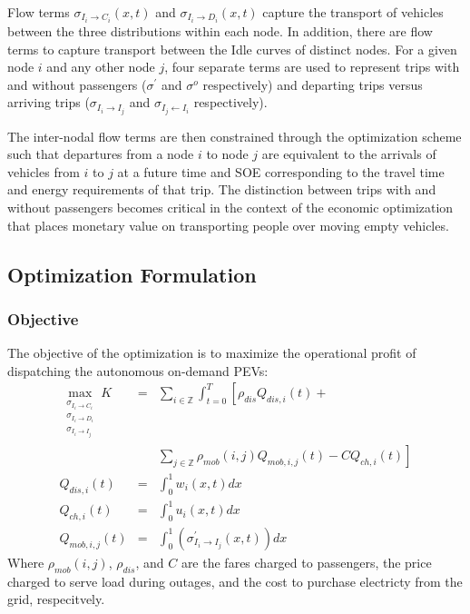 \documentclass[journal]{IEEEtran}
\begin{document}
Flow terms $\sigma_{I_i \rightarrow C_i}(x,t)$ and $\sigma_{I_i \rightarrow D_i}(x,t)$ capture the transport of vehicles between the three distributions within each node. In addition, there are flow terms to capture transport between the Idle curves of distinct nodes. For a given node $i$ and any other node $j$, four separate terms are used to represent trips with and without passengers ($\sigma^\prime$ and $\sigma^o$ respectively) and departing trips versus arriving trips ($\sigma_{I_i \rightarrow I_j}$ and $\sigma_{I_j \leftarrow I_i}$ respectively).

The inter-nodal flow terms are then constrained through the optimization scheme such that departures from a node $i$ to node $j$ are equivalent to the arrivals of vehicles from $i$ to $j$ at a future time and SOE corresponding to the travel time and energy requirements of that trip. The distinction between trips with and without passengers becomes critical in the context of the economic optimization that places monetary value on transporting people over moving empty vehicles.

\subsection{Optimization Formulation}

\subsubsection{Objective}
The objective of the optimization is to maximize the operational profit of dispatching the autonomous on-demand PEVs:
\begin{eqnarray*}
  \max_{\substack{\sigma_{I_i \rightarrow C_i} \\
    \sigma_{I_i \rightarrow D_i} \\ 
    \sigma_{I_i \rightarrow I_j}}}
    K &=& \sum_{i\in\mathbb{Z}} \int_{t=0}^{T} \left[ \rho_{dis} Q_{dis,i}(t) + \right. \\ 
      && \left. \sum_{j\in\mathbb{Z}}\rho_{mob}(i,j)Q_{mob,i,j}(t)  - CQ_{ch,i}(t) \right]\\
    Q_{dis,i}(t) & = & \int_{0}^{1} w_i(x,t) dx \\
    Q_{ch,i}(t) & = & \int_{0}^{1} u_i(x,t) dx \\
    Q_{mob,i,j}(t) & = & \int_{0}^{1}\left( \sigma_{I_i \rightarrow I_j}^\prime(x,t) \right)dx
\end{eqnarray*}
Where $\rho_{mob}(i,j)$, $\rho_{dis}$, and $C$ are the fares charged to passengers, the price charged to serve load during outages, and the cost to purchase electricty from the grid, respecitvely.
\end{document}
